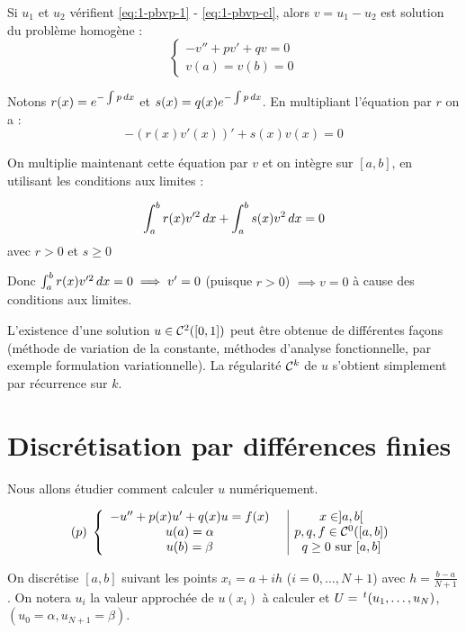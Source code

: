 \begin{preuve}[de l'unicité]
    Si $u_1$ et $u_2$ vérifient \eqref{eq:1-pbvp-1} - \eqref{eq:1-pbvp-cl}, alors
    $v = u_1 - u_2$ est solution du problème homogène :
    \[
        \left\lbrace
        \begin{array}{l}
            -v'' + pv' + qv = 0 \\
            v(a) = v(b) = 0
        \end{array}
        \right.
    \]

    Notons $r(x) = e^{-\int p \,dx}$ et $s(x) = q(x) e^{-\int p \,dx}$.
    En multipliant l'équation par $r$ on a :
    \[
       -\left( r(x) v'(x) \right)' + s(x) v(x) = 0
    \]

    On multiplie maintenant cette équation par $v$ et on intègre sur $[a,b]$,
    en utilisant les conditions aux limites :

    \[
        \int_a^b r (x) v'^2 \,dx + \int_a^b s(x) v^2 \,dx = 0
    \]
    avec $r>0$ et $s \geq 0$

    Donc $\int_a^b r(x) v'^2 \,dx = 0 \implies v'=0$ (puisque $r>0$) $\implies v = 0$ à cause des conditions aux limites.
\end{preuve}

L'existence d'une solution $u \in \mathcal{C}^2([0,1])$ peut être obtenue de différentes façons
(méthode de variation de la constante, méthodes d'analyse fonctionnelle,
par exemple formulation variationnelle).
La régularité $\mathcal{C}^k$ de $u$ s'obtient simplement par récurrence sur $k$.

\section{Discrétisation par différences finies}

Nous allons étudier comment calculer $u$ numériquement.

\[
    (p) \;
    \left\lbrace
    \begin{array}{cc|c}
        -u'' + p(x) u' + q(x) u = f(x) &  & x \in ]a,b[ \\
            u(a) = \alpha &  & p,q,f \in \mathcal{C}^0([a,b]) \\
            u(b) = \beta &  & q \geq 0 \text{ sur } [a,b]
    \end{array}
    \right.
\]

On discrétise $[a,b]$ suivant les points $x_i = a + ih$ ($i=0,\dots,N+1$)
avec $h = \frac{b-a}{N+1}$. On notera $u_i$ la valeur approchée de
$u(x_i)$ à calculer et $U = \,^t(u_1, \dots, u_N)$, $(u_0 = \alpha, u_{N+1} = \beta)$.

